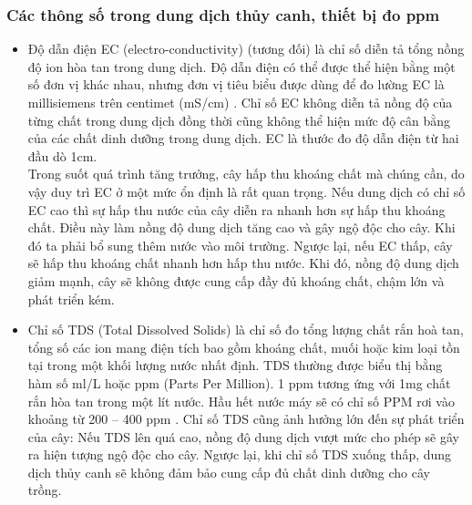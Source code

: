 \documentclass[a4paper,12pt,oneside]{article}
\begin{document}
\subsubsection{Các thông số trong dung dịch thủy canh, thiết bị đo ppm}

\begin{itemize}
\item Độ dẫn điện EC (electro-conductivity) (tương đối) là chỉ số diễn tả tổng nồng độ ion hòa tan trong dung dịch. Độ dẫn điện có thể được thể hiện bằng một số đơn vị khác nhau, nhưng đơn vị tiêu biểu được dùng để đo lường EC là millisiemens trên centimet (mS/cm) \cite{ec}. Chỉ số EC không diễn tả nồng độ của từng chất trong dung dịch đồng thời cũng không thể hiện mức độ cân bằng của các chất dinh dưỡng trong dung dịch. EC là thước đo độ dẫn điện từ hai đầu dò 1cm.\\
Trong suốt quá trình tăng trưởng, cây hấp thu khoáng chất mà chúng cần, do vậy duy trì EC ở một mức ổn định là rất quan trọng. Nếu dung dịch có chỉ số EC cao thì sự hấp thu nước của cây diễn ra nhanh hơn sự hấp thu khoáng chất. Điều này làm nồng độ dung dịch tăng cao và gây ngộ độc cho cây. Khi đó ta phải bổ sung thêm nước vào môi trường. Ngược lại, nếu EC thấp, cây sẽ hấp thu khoáng chất nhanh hơn hấp thu nước. Khi đó, nồng độ dung dịch giảm mạnh, cây sẽ không được cung cấp đầy đủ khoáng chất, chậm lớn và phát triển kém.

\item Chỉ số TDS (Total Dissolved Solids) là chỉ số đo tổng lượng chất rắn hoà tan, tổng số các ion mang điện tích bao gồm khoáng chất, muối hoặc kim loại tồn tại trong một khối lượng nước nhất định. TDS thường được biểu thị bằng hàm số ml/L hoặc ppm (Parts Per Million). 1 ppm tương ứng với 1mg chất rắn hòa tan trong một lít nước. Hầu hết nước máy sẽ có chỉ số PPM rơi vào khoảng từ 200 – 400 ppm \cite{ec}. Chỉ số TDS cũng ảnh hưởng lớn đến sự phát triển của cây: Nếu TDS lên quá cao, nồng độ dung dịch vượt mức cho phép sẽ gây ra hiện tượng ngộ độc cho cây. Ngược lại, khi chỉ số TDS xuống thấp, dung dịch thủy canh sẽ không đảm bảo cung cấp đủ chất dinh dưỡng cho cây trồng.


\end{itemize}
\end{document}

